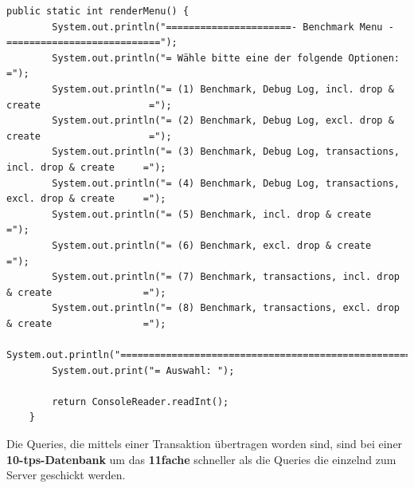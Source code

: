 \begin{lstlisting}[caption={Renderer für das Konsolen Menü}]
	public static int renderMenu() {
		System.out.println("======================- Benchmark Menu -===========================");
		System.out.println("= Wähle bitte eine der folgende Optionen:                         =");
		System.out.println("= (1) Benchmark, Debug Log, incl. drop & create                   =");
		System.out.println("= (2) Benchmark, Debug Log, excl. drop & create                   =");
		System.out.println("= (3) Benchmark, Debug Log, transactions, incl. drop & create     =");
		System.out.println("= (4) Benchmark, Debug Log, transactions, excl. drop & create     =");
		System.out.println("= (5) Benchmark, incl. drop & create                              =");
		System.out.println("= (6) Benchmark, excl. drop & create                              =");
		System.out.println("= (7) Benchmark, transactions, incl. drop & create                =");
		System.out.println("= (8) Benchmark, transactions, excl. drop & create                =");
		System.out.println("===================================================================");
		System.out.print("= Auswahl: ");
		
		return ConsoleReader.readInt();
	}
\end{lstlisting}

 
Die Queries, die mittels einer Transaktion übertragen worden sind, sind bei
einer \textbf{10-tps-Datenbank} um \ca das \textbf{11fache} schneller als die
Queries die einzelnd zum Server geschickt werden.

\begin{figure}[!htbp] 
\end{figure} 


